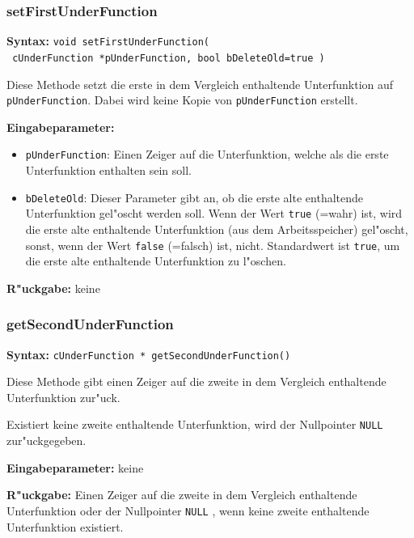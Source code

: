 \subsubsection{setFirstUnderFunction}

\textbf{Syntax:} \verb|void setFirstUnderFunction(| \\\verb| cUnderFunction *pUnderFunction, bool bDeleteOld=true )|

\bigskip\noindent
Diese Methode setzt die erste in dem Vergleich enthaltende Unterfunktion auf \verb|pUnderFunction|. Dabei wird keine Kopie von \verb|pUnderFunction| erstellt.

\bigskip\noindent
\textbf{Eingabeparameter:}
\begin{itemize}
 \item \verb|pUnderFunction|: Einen Zeiger auf die Unterfunktion, welche als die erste Unterfunktion enthalten sein soll.
 \item \verb|bDeleteOld|: Dieser Parameter gibt an, ob die erste alte enthaltende Unterfunktion gel"oscht werden soll. Wenn der Wert \verb|true| (=wahr) ist, wird die erste alte enthaltende Unterfunktion (aus dem Arbeitsspeicher) gel"oscht, sonst, wenn der Wert \verb|false| (=falsch) ist, nicht. Standardwert ist \verb|true|, um die erste alte enthaltende Unterfunktion zu l"oschen.
\end{itemize}

\bigskip\noindent
\textbf{R"uckgabe:} keine


\subsubsection{getSecondUnderFunction}

\textbf{Syntax:} \verb|cUnderFunction * getSecondUnderFunction()|

\bigskip\noindent
Diese Methode gibt einen Zeiger auf die zweite in dem Vergleich enthaltende Unterfunktion zur"uck.

Existiert keine zweite enthaltende Unterfunktion, wird der Nullpointer \verb|NULL| zur"uckgegeben.

\bigskip\noindent
\textbf{Eingabeparameter:} keine

\bigskip\noindent
\textbf{R"uckgabe:} Einen Zeiger auf die zweite in dem Vergleich enthaltende Unterfunktion oder der Nullpointer \verb|NULL| , wenn keine zweite enthaltende Unterfunktion existiert.


